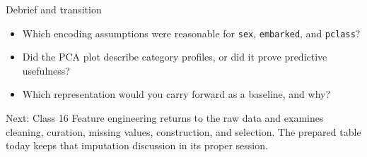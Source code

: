 \begin{frame}{Debrief and transition}
\begin{itemize}
\item Which encoding assumptions were reasonable for \texttt{sex}, \texttt{embarked}, and \texttt{pclass}?
\item Did the PCA plot describe category profiles, or did it prove predictive usefulness?
\item Which representation would you carry forward as a baseline, and why?
\end{itemize}
\begin{block}{Next: Class 16}
Feature engineering returns to the raw data and examines cleaning, curation, missing values, construction, and selection. The prepared table today keeps that imputation discussion in its proper session.
\end{block}
\coursefooter
\end{frame}


